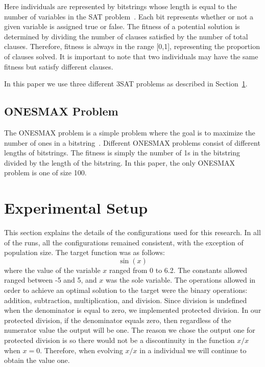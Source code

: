 \documentclass[12pt]{article}
\begin{document}
Here individuals are represented by bitstrings whose length is equal to the number of variables in the SAT problem~\cite{Gottlieb:2002:EAS:638548.638550}. Each bit represents whether or not a given variable is assigned true or false. The fitness of a potential solution is determined by dividing the number of clauses satisfied by the number of total clauses. Therefore, fitness is always in the range [0,1], representing the proportion of clauses solved. It is important to note that two individuals may have the same fitness but satisfy different clauses.

In this paper we use three different 3SAT problems as described in Section~\ref{sec:experiments}.


\subsection{ONESMAX Problem}
\label{sec:ONESMAX}

The ONESMAX problem is a simple problem where the goal is to maximize the number of ones in a bitstring~\cite{Alba:2008}. Different ONESMAX problems consist of different lengths of bitstrings. The fitness is simply the number of 1s in the bitstring divided by the length of the bitstring. In this paper, the only ONESMAX problem is one of size 100.

\section{Experimental Setup} 
\label{sec:experiments}

This section explains the details of the configurations used for this research. In all of the runs, all the configurations remained consistent, with the exception of population size. The target function was as follows:
\[
	\sin(x)
\]
where the value of the variable $x$ ranged from 0 to 6.2. The constants allowed ranged between -5 and 5, and $x$ was the sole variable. The operations allowed in order to achieve an optimal solution to the target were the binary operations: addition, subtraction, multiplication, and division. Since division is undefined when the denominator is equal to zero, we implemented protected division. In our protected division, if the denominator equals zero, then regardless of the numerator value the output will be one. The reason we chose the output one for protected division is so there would not be a discontinuity in the function $x/x$ when $x = 0$. Therefore, when evolving $x/x$ in a individual we will continue to obtain the value one.
\end{document}
